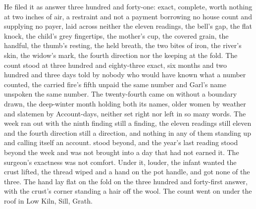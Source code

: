He filed it as answer three hundred and forty-one: exact, complete, worth nothing at two inches of air, a restraint and not a payment borrowing no house count and supplying no payer, laid across neither the eleven readings, the bell's gap, the flat knock, the child's grey fingertips, the mother's cup, the covered grain, the handful, the thumb's resting, the held breath, the two bites of iron, the river's skin, the widow's mark, the fourth direction nor the keeping at the fold. The count stood at three hundred and eighty-three exact, six months and two hundred and three days told by nobody who would have known what a number counted, the carried fire's fifth unpaid the same number and Garl's name unspoken the same number. The twenty-fourth came on without a boundary drawn, the deep-winter month holding both its names, older women by weather and slatemen by Account-days, neither set right nor left in so many words. The week ran out with the ninth finding still a finding, the eleven readings still eleven and the fourth direction still a direction, and nothing in any of them standing up and calling itself an account.  stood beyond, and the year's last reading stood beyond the week and was not brought into a day that had not earned it. The surgeon's exactness was not comfort. Under it, louder, the infant wanted the crust lifted, the thread wiped and a hand on the pot handle, and got none of the three. The hand lay flat on the fold on the three hundred and forty-first answer, with the crust's corner standing a hair off the wool. The count went on under the roof in Low Kiln, Sill, Grath.

